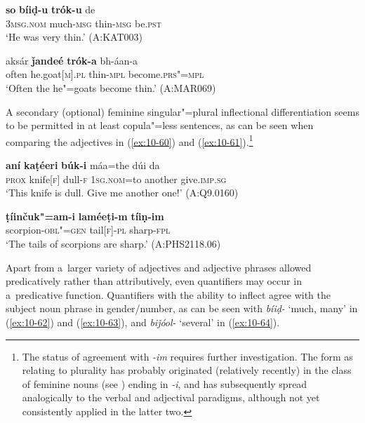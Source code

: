 \begin{exe}
\ex
\label{ex:10-58}
\gll {\ob}\textbf{so}{\cb} {\ob}\textbf{bíiḍ-u} \textbf{trók-u}{\cb} de \\
\textsc{3msg.nom} much-\textsc{msg} thin-\textsc{msg} be.\textsc{pst} \\
\glt `He was very thin.' (A:KAT003)

\ex
\label{ex:10-59}
\gll aksár {\ob}\textbf{ǰandeé}{\cb} {\ob}\textbf{trók-a}{\cb} bh-áan-a \\
often he.goat[\textsc{m}].\textsc{pl} thin-\textsc{mpl} become.\textsc{prs"=mpl} \\
\glt `Often the he"=goats become thin.' (A:MAR069)
\end{exe}


A secondary (optional) feminine singular"=plural inflectional differentiation seems to be permitted in at least copula"=less sentences, as can be seen when comparing the adjectives in (\ref{ex:10-60}) and (\ref{ex:10-61}).\footnote{The status of agreement with \textit{-im} requires further investigation. The form as relating to plurality has probably originated (relatively recently) in the class of feminine nouns (see ) ending in \textit{-i}, and has subsequently spread analogically to the verbal and adjectival paradigms, although not yet consistently applied in the latter two.}

\begin{exe}
\ex
\label{ex:10-60}
\gll {\ob}\textbf{aní} \textbf{kaṭéeri}{\cb} {\ob}\textbf{búk-i}{\cb} máa=the dúi da \\
\textsc{prox} knife[\textsc{f}] dull-\textsc{f} \textsc{1sg.nom=}to another give.\textsc{imp.sg} \\
\glt `This knife is dull. Give me another one!' (A:Q9.0160)

\ex
\label{ex:10-61}
\gll {\ob}\textbf{ṭíinčuk"=am-i} \textbf{laméeṭi-m}{\cb} {\ob}\textbf{tíiṇ-im}{\cb} \\ 
scorpion-\textsc{obl"=gen} tail[\textsc{f}]-\textsc{pl } sharp-\textsc{fpl} \\
\glt `The tails of scorpions are sharp.' (A:PHS2118.06)
\end{exe}

Apart from a~larger variety of adjectives and adjective phrases allowed predicatively rather than attributively, even quantifiers may occur in a~predicative function. Quantifiers with the ability to inflect agree with the subject noun phrase in gender/number, as can be seen with \textit{bíiḍ-} `much, many' in (\ref{ex:10-62}) and (\ref{ex:10-63}), and \textit{biǰóol-} `several' in (\ref{ex:10-64}).

